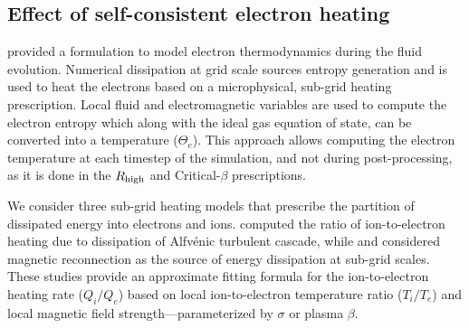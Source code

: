 




\subsection{Effect of self-consistent electron heating}


\citealt{10.1093/mnras/stv2084} provided a formulation to model electron thermodynamics during the fluid evolution. Numerical dissipation at grid scale sources entropy generation and is used to heat the electrons based on a microphysical, sub-grid heating prescription. Local fluid and electromagnetic variables are used to compute the electron entropy which along with the ideal gas equation of state, can be converted into a temperature ($\Theta_{e}$). This approach allows computing the electron temperature at each timestep of the simulation, and not during post-processing, as it is done in the $R_\mathrm{high}$ and Critical-$\beta$ prescriptions.

We consider three sub-grid heating models that prescribe the partition of dissipated energy into electrons and ions. \citealt{2010MNRAS.409L.104H} computed the ratio of ion-to-electron heating due to dissipation of Alfv\'enic turbulent cascade, while \citealt{10.1093/mnras/stx2530} and \citealt{Rowan_2017} considered magnetic reconnection as the source of energy dissipation at sub-grid scales. These studies provide an approximate fitting formula for the ion-to-electron heating rate ($Q_{i}/Q_{e}$) based on local ion-to-electron temperature ratio ($T_{i}/T_{e}$) and local magnetic field strength---parameterized by $\sigma$ or plasma $\beta$.

